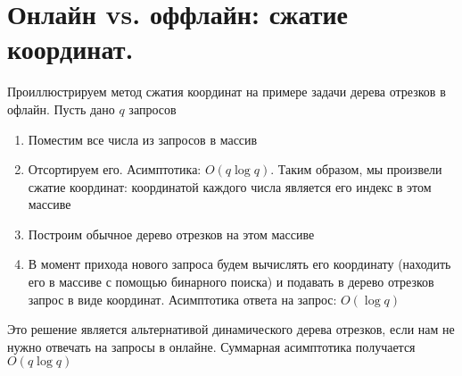 \section{Онлайн vs. оффлайн: сжатие координат.}
\par Проиллюстрируем метод сжатия координат на примере задачи дерева отрезков в офлайн. Пусть дано $q$ запросов\begin{enumerate}
    \item Поместим все числа из запросов в массив
    \item Отсортируем его. Асимптотика: $O(q \log q)$. Таким образом, мы произвели сжатие координат: координатой каждого числа является его индекс в этом массиве
    \item Построим обычное дерево отрезков на этом массиве
    \item В момент прихода нового запроса будем вычислять его координату (находить его в массиве с помощью бинарного поиска) и подавать в дерево отрезков запрос в виде координат. Асимптотика ответа на запрос: $O(\log q)$
\end{enumerate}
\par Это решение является альтернативой динамического дерева отрезков, если нам не нужно отвечать на запросы в онлайне. Суммарная асимптотика получается $O(q \log q)$
